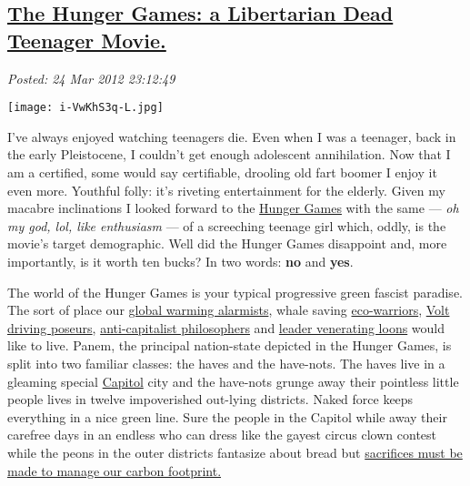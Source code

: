 %

\subsection*{\href{http://bakerjd99.wordpress.com/2012/03/24/the-hunger-games-a-libertarian-dead-teenager-movie/}{The Hunger Games: a Libertarian Dead Teenager Movie.}}


\noindent\emph{Posted: 24 Mar 2012 23:12:49}
\vspace{6pt}

\begin{floatingfigure}[l]{0.32\textwidth}
\centering
\texttt{[image: i-VwKhS3q-L.jpg]}
\label{fig:2685X0}
\end{floatingfigure}I've
always enjoyed watching teenagers die. Even when I was a teenager, back
in the early Pleistocene, I couldn't get enough adolescent annihilation.
Now that I am a certified, some would say certifiable, drooling old fart
boomer I enjoy it even more. Youthful folly: it's riveting entertainment
for the elderly. Given my macabre inclinations I looked forward to the
\href{http://www.thehungergamesmovie.com/}{Hunger Games} with the same
--- \emph{oh my god, lol, like enthusiasm} --- of a screeching teenage
girl which, oddly, is the movie's target demographic. Well did the
Hunger Games disappoint and, more importantly, is it worth ten bucks? In
two words: \textbf{no} and \textbf{yes}.

The world of the Hunger Games is your typical progressive green fascist
paradise. The sort of place our
\href{http://www.thenewamerican.com/usnews/politics/11094-ethical-meltdown-global-warming-alarmists-defend-peter-gleicks-theft-fraud}{global
warming alarmists}, whale saving
\href{http://bardofely.hubpages.com/hub/Was-Charles-Manson-the-first-eco-warrior}{eco-warriors},
\href{http://autos.aol.com/article/why-the-chevy-volt-is-attracting-wealthy-buyers/}{Volt
driving poseurs},
\href{http://www.thefreemanonline.org/book-reviews/the-complete-idiots-guide-to-economics/}{anti-capitalist
philosophers} and
\href{http://www.youtube.com/watch?v=KI-BCbKuJGA}{leader venerating
loons} would like to live. Panem, the principal nation-state depicted in
the Hunger Games, is split into two familiar classes: the haves and the
have-nots. The haves live in a gleaming special
\href{http://seattletimes.nwsource.com/html/microsoftpri0/2017796920\_touring\_the\_hunger\_games\_panems\_capitol\_city\_with.html}{Capitol}
city and the have-nots grunge away their pointless little people lives
in twelve impoverished out-lying districts. Naked force keeps everything
in a nice green line. Sure the people in the Capitol while away their
carefree days in an endless who can dress like the gayest circus clown
contest while the peons in the outer districts fantasize about bread but
\href{http://thehumanfuture.cbc-network.org/2012/03/global-warming-hysteria-embracing-their-inner-transhumanist/}{sacrifices
must be made to manage our carbon footprint.}

